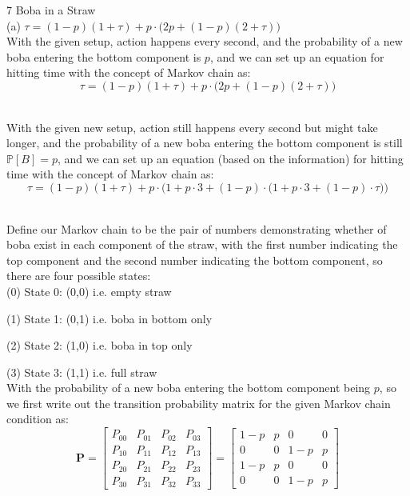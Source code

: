 \documentclass{article}
\begin{document}
{\Large 7 Boba in a Straw} \\[.5cm]
{\color{red} (a) $\tau = (1 - p)(1 + \tau) +
	p \cdot \big(2p + (1 - p)(2 + \tau)\big) $} \\

With the given setup, action happens every second, and the probability of a new boba entering the bottom component is $p$, and we can set up an equation for hitting time with the concept of Markov chain as:
$$\tau = (1 - p)(1 + \tau) +
	p \cdot \big(2p + (1 - p)(2 + \tau)\big) $$



 \\

With the given new setup, action still happens every second but might take longer, and the probability of a new boba entering the bottom component is still $\mathbb{P}[B] = p$, and we can set up an equation (based on the information) for hitting time with the concept of Markov chain as:
$$\tau =
(1 - p)(1 + \tau) +
p \cdot \Big(1 +
	p \cdot 3 +
	(1-p) \cdot \big(1 +
		p \cdot 3 +
		(1-p) \cdot \tau
		\big)
	\Big)
$$



 \\

Define our Markov chain to be the pair of numbers demonstrating whether of boba exist in each component of the straw, with the first number indicating the top component and the second number indicating the bottom component, so there are four possible states: \\

(0) State 0: (0,0) i.e. empty straw

(1) State 1: (0,1) i.e. boba in bottom only

(2) State 2: (1,0) i.e. boba in top only

(3) State 3: (1,1) i.e. full straw \\

With the probability of a new boba entering the bottom component being $p$,
so we first write out the transition probability matrix for the given Markov chain condition as:
$$ \mathbf{P} =
\begin{bmatrix}
	P_{00} & P_{01} & P_{02} & P_{03} \\
	P_{10} & P_{11} & P_{12} & P_{13} \\
	P_{20} & P_{21} & P_{22} & P_{23} \\
	P_{30} & P_{31} & P_{32} & P_{33}
\end{bmatrix} =
\begin{bmatrix}
	1-p & p & 0 & 0 \\
	0 & 0 & 1-p & p \\
	1-p & p & 0 & 0 \\
	0 & 0 & 1-p & p
\end{bmatrix} $$
\end{document}
